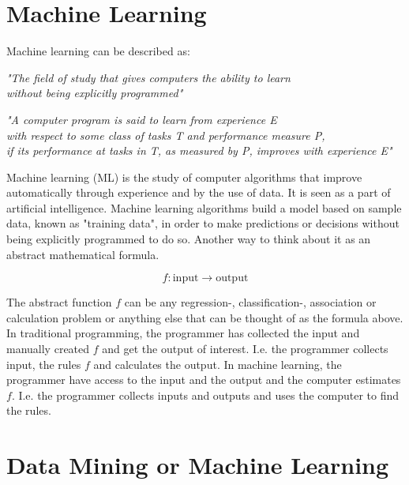 \section{Machine Learning}

Machine learning can be described as:

\begin{center}
    \textit{"The field of study that gives computers the ability to learn \\
    without being explicitly programmed"}
\end{center}

\begin{center}
    \textit{"A computer program is said to learn from experience E \\
     with respect to some class of tasks T and performance measure P, \\
     if its performance at tasks in T, as measured by P, improves with experience E"}
\end{center}

Machine learning (ML) is the study of computer algorithms that improve 
automatically through experience and by the use of data. It is seen as a part of 
artificial intelligence. Machine learning algorithms build a model based on 
sample data, known as "training data", in order to make predictions or decisions 
without being explicitly programmed to do so. Another way to think about it as 
an abstract mathematical formula.

\begin{equation}
    f: \text{input} \rightarrow \text{output}
\end{equation}

The abstract function $f$ can be any regression-, classification-, association
or calculation problem or anything else that can be thought of as the formula
above. In traditional programming, the programmer has collected the input
and manually created $f$ and get the output of interest. I.e. the programmer
collects input, the rules $f$ and calculates the output. In machine learning, 
the programmer have access to the input and the output 
and the computer estimates $f$. I.e. the programmer collects inputs and outputs
and uses the computer to find the rules. 

\newpage
\section{Data Mining or Machine Learning}

